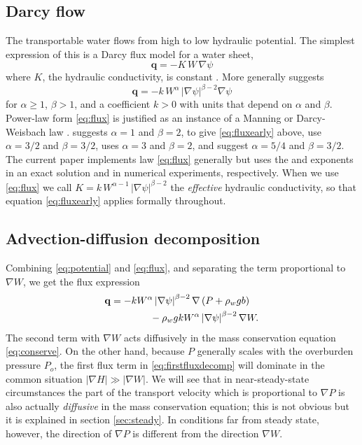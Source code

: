 \documentclass[gmd]{copernicus}   %
\newcommand\bq{\mathbf{q}}
\newcommand{\grad}{\nabla}
\begin{document}
\subsection{Darcy flow}  The transportable water flows from high to low hydraulic potential.  The simplest expression of this is a Darcy flux model for a water sheet,
\begin{equation}  \label{eq:fluxearly}
\bq = - K \,W\, \grad \psi
\end{equation}
where $K$, the hydraulic conductivity, is constant \citep{Clarke05}.  More generally \cite{Schoofetal2012} suggests
\begin{equation}  \label{eq:flux}
\bq = - k\, W^\alpha\, |\grad \psi|^{\beta-2} \grad \psi
\end{equation}
for $\alpha \ge 1$, $\beta>1$, and a coefficient $k>0$ with units that depend on $\alpha$ and $\beta$.  Power-law form \eqref{eq:flux} is justified as an instance of a Manning or Darcy-Weisbach law \citep{Schoofetal2012}.  \cite{Clarke05} suggests $\alpha=1$ and $\beta=2$, to give \eqref{eq:fluxearly} above, \cite{CreytsSchoof2009} use $\alpha=3/2$ and $\beta=3/2$, \cite{Hewitt2011,Hewitt2013} uses $\alpha=3$ and $\beta = 2$, and \cite{Hewittetal2012} suggest $\alpha=5/4$ and $\beta=3/2$.  The current paper implements law \eqref{eq:flux} generally but uses the \cite{Clarke05} and \cite{Hewittetal2012} exponents in an exact solution and in numerical experiments, respectively.  When we use \eqref{eq:flux} we call $K = k\, W^{\alpha-1}\, |\grad \psi|^{\beta-2}$ the \emph{effective} hydraulic conductivity, so that equation \eqref{eq:fluxearly} applies formally throughout.

\subsection{Advection-diffusion decomposition}  Combining \eqref{eq:potential} and \eqref{eq:flux}, and separating the term proportional to $\grad W$, we get the flux expression
\begin{align}
\bq &= - k  W^\alpha \left|\grad \psi\right|^{\beta-2} \grad \left(P + \rho_w g b\right)  \label{eq:firstfluxdecomp} \\
    &\qquad\qquad - \rho_w g k W^\alpha \left|\grad \psi\right|^{\beta-2} \grad W.  \notag
\end{align}
The second term with $\grad W$ acts diffusively in the mass conservation equation \eqref{eq:conserve}.  On the other hand, because $P$ generally scales with the overburden pressure $P_o$, the first flux term in \eqref{eq:firstfluxdecomp} will dominate in the common situation $|\grad H| \gg |\grad W|$.  We will see that in near-steady-state circumstances the part of the transport velocity which is proportional to $\grad P$ is also actually \emph{diffusive} in the mass conservation equation; this is not obvious but it is explained in section \ref{sec:steady}.  In conditions far from steady state, however, the direction of $\grad P$ is different from the direction $\grad W$.
\end{document}

